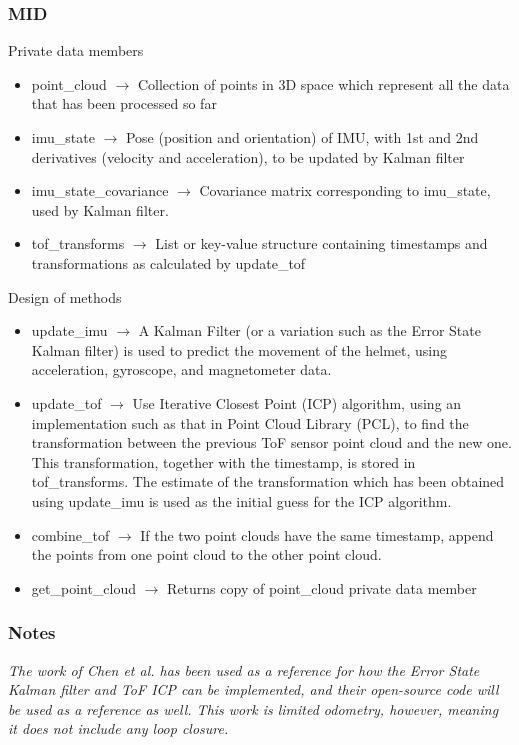 \documentclass[11pt]{article}
\begin{document}
			\subsubsection{MID}
Private data members 
\begin{itemize}
	\item point\_cloud $\rightarrow$ Collection of points in 3D space which represent all the data that has been processed so far 
	\item imu\_state $\rightarrow$ Pose (position and orientation) of IMU, with 1st and 2nd derivatives (velocity and acceleration), to be updated by Kalman filter 
	\item imu\_state\_covariance $\rightarrow$ Covariance matrix corresponding to imu\_state, used by Kalman filter. 
	\item tof\_transforms $\rightarrow$ List or key-value structure containing timestamps and transformations as calculated by update\_tof 
\end{itemize}
Design of methods 
\begin{itemize}
\item update\_imu $\rightarrow$ A Kalman Filter (or a variation such as the Error State Kalman filter) is used to predict the movement of the helmet, using acceleration, gyroscope, and magnetometer data. 
\item update\_tof $\rightarrow$ Use Iterative Closest Point (ICP) algorithm, using an implementation such as that in Point Cloud Library (PCL), to find the transformation between the previous ToF sensor point cloud and the new one. This transformation, together with the timestamp, is stored in tof\_transforms. The estimate of the transformation which has been obtained using update\_imu is used as the initial guess for the ICP algorithm. 
\item combine\_tof $\rightarrow$ If the two point clouds have the same timestamp, append the points from one point cloud to the other point cloud. 
\item get\_point\_cloud $\rightarrow$ Returns copy of point\_cloud private data member 
\end{itemize}

\subsubsection{Notes} 

\textit{The work of Chen et al. \cite{chen} has been used as a reference for how the Error State Kalman filter and ToF ICP can be implemented, and their open-source code will be used as a reference as well. This work is limited odometry, however, meaning it does not include any loop closure. }
\end{document}

